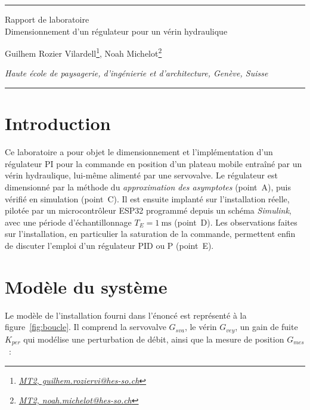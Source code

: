 ﻿\documentclass[a4paper,5pt]{article}
\begin{document}
\begin{center}
\rule{\linewidth}{0.4pt}
{\large
Rapport de laboratoire\\
\vspace{2mm}
Dimensionnement d'un régulateur pour un vérin hydraulique
}

\vspace{8mm}

Guilhem Rozier Vilardell\footnote{\textit{\href{mailto:guilhem.roziervi@hes-so.ch}{MT2, guilhem.roziervi@hes-so.ch}}},
Noah Michelot\footnote{\textit{\href{mailto:noah.michelot@hes-so.ch}{MT2, noah.michelot@hes-so.ch}}}

\vspace{3mm}

\footnotesize{
\textit{Haute école de paysagerie, d'ingénierie et d'architecture, Genève, Suisse}
}
\rule{\linewidth}{0.4pt}
\vspace{9mm}

\end{center}

\setlength{\parskip}{10pt}


\section{Introduction}

Ce laboratoire a pour objet le dimensionnement et l'implémentation d'un
régulateur PI pour la commande en position d'un plateau mobile entraîné par un
vérin hydraulique, lui-même alimenté par une servovalve. Le régulateur est
dimensionné par la méthode du \emph{approximation des asymptotes} (point~A), puis vérifié en simulation (point~C). Il est ensuite implanté sur l'installation réelle, pilotée par un microcontrôleur ESP32 programmé depuis un schéma \textit{Simulink}, avec une période d'échantillonnage $T_E = 1~\mathrm{ms}$ (point~D). Les observations faites sur l'installation,
en particulier la saturation de la commande, permettent enfin de discuter
l'emploi d'un régulateur PID ou P (point~E).

\section{Modèle du système}

Le modèle de l'installation fourni dans l'énoncé est représenté à la
figure~\ref{fig:boucle}. Il comprend la servovalve $G_{sva}$, le vérin
$G_{vey}$, un gain de fuite $K_{per}$ qui modélise une perturbation de débit,
ainsi que la mesure de position $G_{mes}$~:
\end{document}
